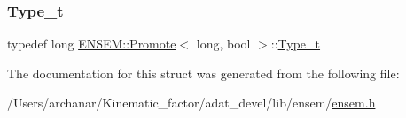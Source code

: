 \subsubsection{\texorpdfstring{Type\_t}{Type\_t}\hspace{0.1cm}{\footnotesize\ttfamily [2/2]}}
{\footnotesize\ttfamily typedef long \mbox{\hyperlink{structENSEM_1_1Promote}{E\+N\+S\+E\+M\+::\+Promote}}$<$ long, bool $>$\+::\mbox{\hyperlink{structENSEM_1_1Promote_3_01long_00_01bool_01_4_aa60bf905b8b32da5f453ddcc2d32f24e}{Type\+\_\+t}}}



The documentation for this struct was generated from the following file\+:\begin{DoxyCompactItemize}
\item 
/\+Users/archanar/\+Kinematic\+\_\+factor/adat\+\_\+devel/lib/ensem/\mbox{\hyperlink{lib_2ensem_2ensem_8h}{ensem.\+h}}\end{DoxyCompactItemize}

